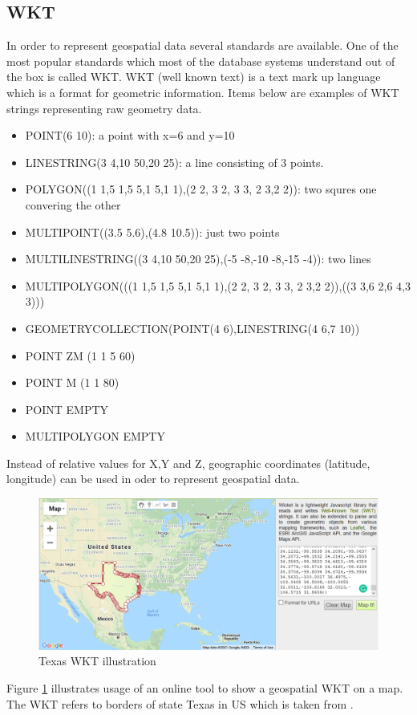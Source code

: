 \documentclass[a4]{report}
\begin{document}
        \subsection{WKT \cite{WKT}}
        In order to represent geospatial data several standards are available.
        One of the most popular standards which most of the database systems understand out of the box is called WKT.
        WKT (well known text) is a text mark up language which is a format for geometric information.
        Items below are examples of WKT strings representing raw geometry data.
        \begin{itemize}
            \item POINT(6 10): a point with x=6 and y=10
            \item LINESTRING(3 4,10 50,20 25): a line consisting of 3 points.
            \item POLYGON((1 1,5 1,5 5,1 5,1 1),(2 2, 3 2, 3 3, 2 3,2 2)): two squres one convering the other
            \item MULTIPOINT((3.5 5.6),(4.8 10.5)): just two points
            \item MULTILINESTRING((3 4,10 50,20 25),(-5 -8,-10 -8,-15 -4)): two lines
            \item MULTIPOLYGON(((1 1,5 1,5 5,1 5,1 1),(2 2, 3 2, 3 3, 2 3,2 2)),((3 3,6 2,6 4,3 3)))
            \item GEOMETRYCOLLECTION(POINT(4 6),LINESTRING(4 6,7 10))
            \item POINT ZM (1 1 5 60)
            \item POINT M (1 1 80)
            \item POINT EMPTY
            \item MULTIPOLYGON EMPTY
        \end{itemize}

        Instead of relative values for X,Y and Z, geographic coordinates (latitude, longitude) can be used in oder to
        represent geospatial data.

        \begin{figure}[ht]
            \caption{Texas WKT illustration}
            \label{fig:texas}
            \includegraphics[scale=0.4]{images/texas.png}
        \end{figure}
        Figure \ref{fig:texas} illustrates usage of an online tool \cite{WKTtool} to show a geospatial WKT on a map.
        The WKT refers to borders of state Texas in US which is taken from \cite{WKTs}.
\end{document}
